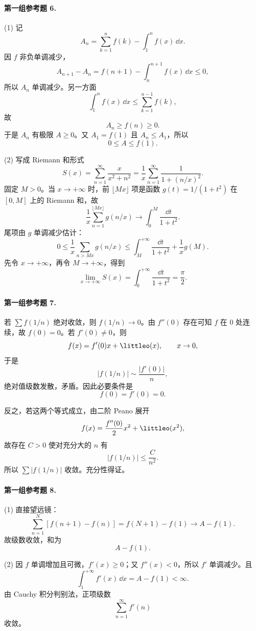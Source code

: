 \paragraph{第一组参考题 6.}
\begin{xsolution}
(1) 记
\[
 A_n=\sum_{k=1}^{n}f(k)-\int_1^n f(x)\,\dd x.
\]
因 $f$ 非负单调减少，
\[
 A_{n+1}-A_n
 =f(n+1)-\int_n^{n+1}f(x)\,\dd x\leq0,
\]
所以 $A_n$ 单调减少。另一方面
\[
 \int_1^n f(x)\,\dd x
 \leq\sum_{k=1}^{n-1}f(k),
\]
故
\[
 A_n\geq f(n)\geq0.
\]
于是 $A_n$ 有极限 $A\geq0$。又 $A_1=f(1)$ 且 $A_n\leq A_1$，所以
\[
 0\leq A\leq f(1).
\]

(2) 写成 Riemann 和形式
\[
 S(x)=\sum_{n=1}^{\infty}\frac{x}{x^2+n^2}
 =\frac1x\sum_{n=1}^{\infty}\frac1{1+(n/x)^2}.
\]
固定 $M>0$。当 $x\to+\infty$ 时，前 $\lfloor Mx\rfloor$ 项是函数 $g(t)=1/(1+t^2)$ 在 $[0,M]$ 上的 Riemann 和，故
\[
 \frac1x\sum_{n=1}^{\lfloor Mx\rfloor}g(n/x)
 \longrightarrow\int_0^M\frac{\dd t}{1+t^2}.
\]
尾项由 $g$ 单调减少估计：
\[
 0\leq\frac1x\sum_{n> Mx}g(n/x)
 \leq\int_M^{+\infty}\frac{\dd t}{1+t^2}+\frac1x g(M).
\]
先令 $x\to+\infty$，再令 $M\to+\infty$，得到
\[
 \lim_{x\to+\infty}S(x)
 =\int_0^{+\infty}\frac{\dd t}{1+t^2}
 =\boxed{\frac\pi2}.
\]
\end{xsolution}

\paragraph{第一组参考题 7.}
\begin{xsolution}
若 $\sum f(1/n)$ 绝对收敛，则 $f(1/n)\to0$。由 $f''(0)$ 存在可知 $f$ 在 $0$ 处连续，故 $f(0)=0$。若 $f'(0)\neq0$，则
\[
 f(x)=f'(0)x+\littleo(x),\qquad x\to0,
\]
于是
\[
 |f(1/n)|\sim\frac{|f'(0)|}{n},
\]
绝对值级数发散，矛盾。因此必要条件是
\[
 f(0)=f'(0)=0.
\]

反之，若这两个等式成立，由二阶 Peano 展开
\[
 f(x)=\frac{f''(0)}2x^2+\littleo(x^2),
\]
故存在 $C>0$ 使对充分大的 $n$ 有
\[
 |f(1/n)|\leq\frac C{n^2}.
\]
所以 $\sum|f(1/n)|$ 收敛。充分性得证。
\end{xsolution}

\paragraph{第一组参考题 8.}
\begin{xsolution}
(1) 直接望远镜：
\[
 \sum_{n=1}^{N}[f(n+1)-f(n)]=f(N+1)-f(1)\longrightarrow A-f(1).
\]
故级数收敛，和为
\[
 \boxed{A-f(1)}.
\]

(2) 因 $f$ 单调增加且可微，$f'(x)\geq0$；又 $f''(x)<0$，所以 $f'$ 单调减少。且
\[
 \int_1^{+\infty}f'(x)\,\dd x
 =A-f(1)<\infty.
\]
由 Cauchy 积分判别法，正项级数
\[
 \sum_{n=1}^{\infty}f'(n)
\]
收敛。
\end{xsolution}


